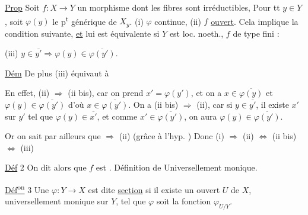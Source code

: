 \uline{Prop}  Soit $f:X\to Y$ un morphisme   dont les fibres sont  irréductibles, Pour tt $y\in Y$, soit $\varphi(y)$ le p\textsuperscript{t} générique de $X_y$.   (i) $\varphi$  continue,    (ii) $f$  \uline{ouvert}. Cela implique la condition suivante, \uline{et} lui est équivalente si $Y$ est loc. noeth., $f$ de type fini :

(iii) $y\in\overline{y'}\Rightarrow\varphi(y)\in\overline{\varphi(y')}$.

\uline{Dém}   De plus (iii) équivaut à 

En effet,  (ii) $\Rightarrow$ (ii bis), car on prend $x'=\varphi(y')$, et on a $x\in\overline{\varphi(y)}$ et $\varphi(y)\in\overline{\varphi(y')}$ d'où $x\in\overline{\varphi(y')}$. On a (ii bis) $\Rightarrow$ (ii), car  si $y\in\overline{y'}$, il existe $x'$ sur $y'$ tel que $\varphi(y)\in\overline{x'}$, et comme $x'\in\overline{\varphi(y')}$, on aura $\varphi(y)\in\overline{\varphi(y')}$.

Or on sait par ailleurs que    $\Rightarrow$ (ii)  (grâce à l'hyp. ) Donc (i) $\Rightarrow$ (ii) $\Longleftrightarrow$ (ii bis) $\Longleftrightarrow$ (iii)

\uline{Déf} 2 On dit alors que $f$ est \uline{}. Définition de Universellement monique.

\uline{Déf\textsuperscript{on}} 3 Une   $\varphi:Y\to X$ est dite \uline{section} \uline{} si il existe un ouvert $U$ de $X$, universellement monique sur $Y$, tel que $\varphi$ soit la fonction $\varphi_{U/Y}$.
